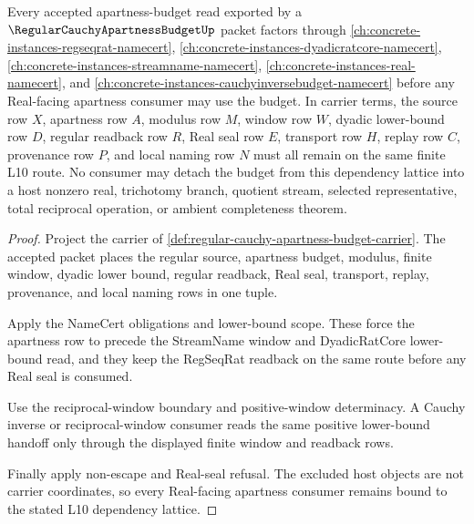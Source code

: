 \begin{theorem}
\label{thm:regular-cauchy-apartness-budget-l10-scope-binding}
Every accepted apartness-budget read exported by a $\RegularCauchyApartnessBudgetUp$ packet factors through \autoref{ch:concrete-instances-regseqrat-namecert}, \autoref{ch:concrete-instances-dyadicratcore-namecert}, \autoref{ch:concrete-instances-streamname-namecert}, \autoref{ch:concrete-instances-real-namecert}, and \autoref{ch:concrete-instances-cauchyinversebudget-namecert} before any Real-facing apartness consumer may use the budget. In carrier terms, the source row $X$, apartness row $A$, modulus row $M$, window row $W$, dyadic lower-bound row $D$, regular readback row $R$, Real seal row $E$, transport row $H$, replay row $C$, provenance row $P$, and local naming row $N$ must all remain on the same finite L10 route. No consumer may detach the budget from this dependency lattice into a host nonzero real, trichotomy branch, quotient stream, selected representative, total reciprocal operation, or ambient completeness theorem.
\end{theorem}
\begin{proof}
Project the carrier of \autoref{def:regular-cauchy-apartness-budget-carrier}. The accepted packet places the regular source, apartness budget, modulus, finite window, dyadic lower bound, regular readback, Real seal, transport, replay, provenance, and local naming rows in one tuple.

Apply the NameCert obligations and lower-bound scope. These force the apartness row to precede the StreamName window and DyadicRatCore lower-bound read, and they keep the RegSeqRat readback on the same route before any Real seal is consumed.

Use the reciprocal-window boundary and positive-window determinacy. A Cauchy inverse or reciprocal-window consumer reads the same positive lower-bound handoff only through the displayed finite window and readback rows.

Finally apply non-escape and Real-seal refusal. The excluded host objects are not carrier coordinates, so every Real-facing apartness consumer remains bound to the stated L10 dependency lattice.
\end{proof}

